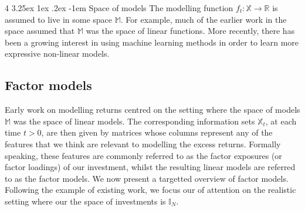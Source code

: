 \documentclass[12pt]{article}
\makeatletter
\renewcommand\paragraph{%
	\@startsection{paragraph}
	{4}
	{\z@}
	{3.25ex \@plus1ex \@minus.2ex}
	{-1em}
	{\normalfont\normalsize\bfseries\maybe@addperiod}%
}
\newcommand{\maybe@addperiod}[1]{%
	#1\@addpunct{.}%
}
\makeatother
\begin{document}
\paragraph{Space of models} The modelling function $f_t: \mathbb{X} \rightarrow \mathbb{R}$ is assumed to live in some space $\mathbb{M}$. For example, much of the earlier work in the space assumed that $\mathbb{M}$ was the space of linear functions. More recently, there has been a growing interest in using machine learning methods in order to learn more expressive non-linear models.

\subsection{Factor models}
\label{sec:factor_models}
Early work on modelling returns centred on the setting where the space of models $\mathbb{M}$ was the space of linear models. The corresponding information sets $\mathbb{X}_t$, at each time $t>0$, are then given by matrices whose columns represent any of the features that we think are relevant to modelling the excess returns. Formally speaking, these features are commonly referred to as the factor exposures (or factor loadings) of our investment, whilst the resulting linear models are referred to as the factor models. We now present a targetted overview of factor models. Following the example of existing work, we focus our of attention on the realistic setting where our the space of investments is $\mathbb{I}_N$.
\end{document}
